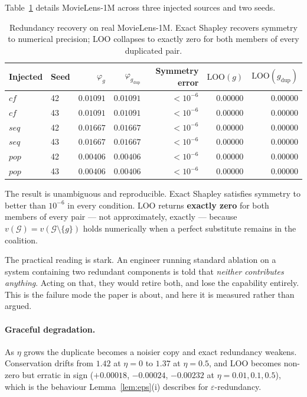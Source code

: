 \documentclass[11pt]{article}
\newcommand{\G}{\mathcal{G}}
\newcommand{\LOO}{\mathrm{LOO}}
\begin{document}
\noindent
Table~\ref{tab:recovery} details MovieLens-1M across three injected sources and
two seeds.

\begin{table}[htbp]
\centering\footnotesize
\caption{Redundancy recovery on real MovieLens-1M. Exact Shapley recovers
symmetry to numerical precision; LOO collapses to exactly zero for both members
of every duplicated pair.}
\label{tab:recovery}
\begin{tabular}{llrrrrr}
\toprule
Injected & Seed & $\varphi_{g}$ & $\varphi_{g_{\text{dup}}}$ &
Symmetry error & $\LOO(g)$ & $\LOO(g_{\text{dup}})$ \\
\midrule
$cf$  & 42 & $0.01091$ & $0.01091$ & $<10^{-6}$ & $0.00000$ & $0.00000$ \\
$cf$  & 43 & $0.01091$ & $0.01091$ & $<10^{-6}$ & $0.00000$ & $0.00000$ \\
$seq$ & 42 & $0.01667$ & $0.01667$ & $<10^{-6}$ & $0.00000$ & $0.00000$ \\
$seq$ & 43 & $0.01667$ & $0.01667$ & $<10^{-6}$ & $0.00000$ & $0.00000$ \\
$pop$ & 42 & $0.00406$ & $0.00406$ & $<10^{-6}$ & $0.00000$ & $0.00000$ \\
$pop$ & 43 & $0.00406$ & $0.00406$ & $<10^{-6}$ & $0.00000$ & $0.00000$ \\
\bottomrule
\end{tabular}
\end{table}

The result is unambiguous and reproducible. Exact Shapley satisfies symmetry to
better than $10^{-6}$ in every condition. LOO returns \textbf{exactly zero} for
both members of every pair --- not approximately, exactly --- because
$v(\G) = v(\G \setminus \{g\})$ holds numerically when a perfect substitute
remains in the coalition.

The practical reading is stark. An engineer running standard ablation on a
system containing two redundant components is told that \emph{neither
contributes anything}. Acting on that, they would retire both, and lose the
capability entirely. This is the failure mode the paper is about, and here it
is measured rather than argued.

\paragraph{Graceful degradation.} As $\eta$ grows the duplicate becomes a
noisier copy and exact redundancy weakens. Conservation drifts from $1.42$ at
$\eta = 0$ to $1.37$ at $\eta = 0.5$, and LOO becomes non-zero but erratic in
sign ($+0.00018$, $-0.00024$, $-0.00232$ at $\eta = 0.01, 0.1, 0.5$), which is
the behaviour Lemma~\ref{lem:eps}(i) describes for $\varepsilon$-redundancy.
\end{document}

